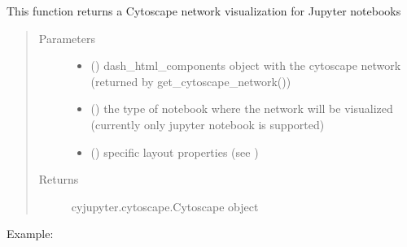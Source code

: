 \documentclass[letterpaper,10pt,english]{sphinxmanual}
\begin{document}
\begin{fulllineitems}
\label{\detokenize{_autosummary/analytics_core.viz:analytics_core.viz.viz.visualize_notebook_path}}
This function returns a Cytoscape network visualization for Jupyter notebooks
\begin{quote}\begin{description}
\item[{Parameters}] \leavevmode\begin{itemize}
\item {} 
 () \textendash{} dash\_html\_components object with the cytoscape network (returned by get\_cytoscape\_network())

\item {} 
 () \textendash{} the type of notebook where the network will be visualized (currently only jupyter notebook is supported)

\item {} 
 () \textendash{} specific layout properties (see )

\end{itemize}

\item[{Returns}] \leavevmode
cyjupyter.cytoscape.Cytoscape object

\end{description}\end{quote}

Example:

\begin{sphinxVerbatim}[commandchars=\\\{\}]
    
                                                     
 
\end{sphinxVerbatim}


\end{fulllineitems}
\end{document}
